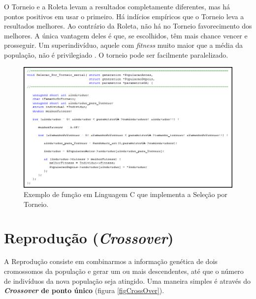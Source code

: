 	O Torneio e a Roleta levam a resultados completamente diferentes, mas há pontos positivos em usar o primeiro. Há indícios empíricos que o Torneio leva a resultados melhores. Ao contrário da Roleta, não há no Torneio favorecimento dos melhores. A única vantagem deles é que, se escolhidos, têm mais chance vencer e prosseguir. Um superindivíduo, aquele com \emph{fitness} muito maior que a média da população, não é privilegiado \cite{Linden2008}. O torneio pode ser facilmente paralelizado.
	
	\begin{figure}[htp]
		\begin{center}
			\includegraphics[width=1.0\textwidth]{figs/ga/codigoSelecaoTorneio.png}
		\end{center}
		\caption{\label{fig:codigoSelecaoTorneio}Exemplo de função em Linguagem C que implementa a Seleção por Torneio.}
	\end{figure}
	
	
	\section{\label{crossover}Reprodução (\textit{Crossover})}

	A Reprodução consiste em combinarmos a informação genética de dois cromossomos da população e gerar um ou mais descendentes, até que o número de indivíduos da nova população seja atingido. Uma maneira simples é através do \textbf{\textit{Crossover} de ponto único} (figura \ref{figCrossOver}).
	
